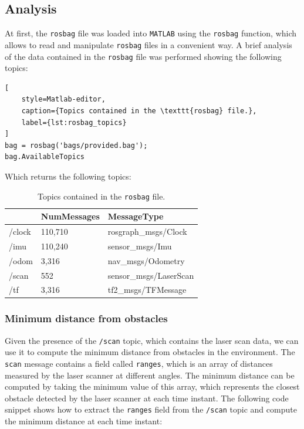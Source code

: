 \subsection{Analysis}
\label{subsec:analysis_part_A}

At first, the \texttt{rosbag} file was loaded into \texttt{MATLAB} using the \texttt{rosbag} function, which allows to read and manipulate \texttt{rosbag} files in a convenient way.
A brief analysis of the data contained in the \texttt{rosbag} file was performed showing the following topics:

\begin{lstlisting}[
    style=Matlab-editor,
    caption={Topics contained in the \texttt{rosbag} file.},
    label={lst:rosbag_topics}
]
bag = rosbag('bags/provided.bag');
bag.AvailableTopics
\end{lstlisting}

Which returns the following topics:

\begin{table}[H]
    \centering
    \begin{tabular}{l|l|l}
        ~      & \textbf{NumMessages} & \textbf{MessageType}   \\
        \hline
        /clock & 110,710              & rosgraph\_msgs/Clock   \\
        /imu   & 110,240              & sensor\_msgs/Imu       \\
        /odom  & 3,316                & nav\_msgs/Odometry     \\
        /scan  & 552                  & sensor\_msgs/LaserScan \\
        /tf    & 3,316                & tf2\_msgs/TFMessage    \\
        \hline
    \end{tabular}
    \caption{Topics contained in the \texttt{rosbag} file.}
    \label{tab:rosbag_topics}
\end{table}


\subsubsection{Minimum distance from obstacles}
\label{subsubsec:minimum_distance}

Given the presence of the \texttt{/scan} topic, which contains the laser scan data, we can use it to compute the minimum distance from obstacles in the environment.
The \texttt{scan} message contains a field called \texttt{ranges}, which is an array of distances measured by the laser scanner at different angles.
The minimum distance can be computed by taking the minimum value of this array, which represents the closest obstacle detected by the laser scanner at each time instant.
The following code snippet shows how to extract the \texttt{ranges} field from the \texttt{/scan} topic and compute the minimum distance at each time instant:

